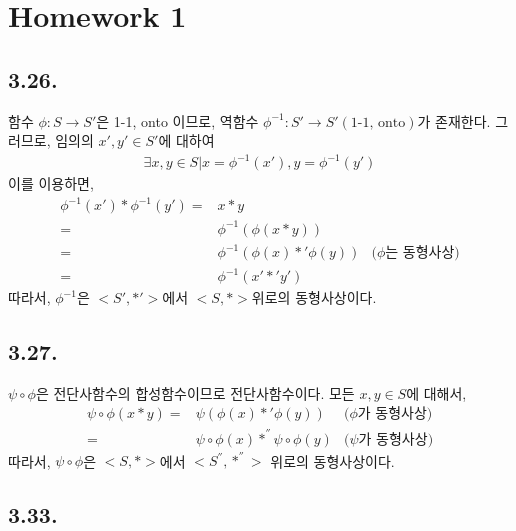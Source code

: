 \documentclass{article}
\begin{document}
\twocolumn



\section{Homework 1}

\subsection{3.26.}
함수 $\phi : S \rightarrow S'$은 1-1, onto 이므로, 역함수 $\phi^{-1} : S' \rightarrow S' (\text{1-1, onto})$가 존재한다. 그러므로, 임의의 $x', y' \in S'$에 대하여
\begin{align*}
\exists x, y \in S | x = \phi^{-1}(x'), y = \phi^{-1}(y')
\end{align*}
이를 이용하면, 
\begin{align*}
\phi^{-1}(x') * \phi^{-1}(y') =& x * y
\\ =& \phi^{-1}(\phi(x * y))
\\ =& \phi^{-1}(\phi(x) *' \phi(y)) &\text{($\phi$는 동형사상)}
\\ =& \phi^{-1}(x' *' y')
\end{align*}
따라서, $\phi^{-1}$은 $<S', *'>$에서 $<S, *>$위로의 동형사상이다.

\subsection{3.27.}
$\psi \circ \phi$은 전단사함수의 합성함수이므로 전단사함수이다. 모든 $x, y \in S$에 대해서,
\begin{align*}
\psi \circ \phi(x * y) =& \psi(\phi(x) *' \phi(y)) &\text{($\phi$가 동형사상)}
\\ =& \psi \circ \phi(x) *^{''} \psi \circ \phi(y) &\text{($\psi$가 동형사상)}
\end{align*}
따라서, $\psi \circ \phi$은 $<S, *>$에서 $<S^{''}, *^{''}>$ 위로의 동형사상이다.

\subsection{3.33.}
\end{document}
